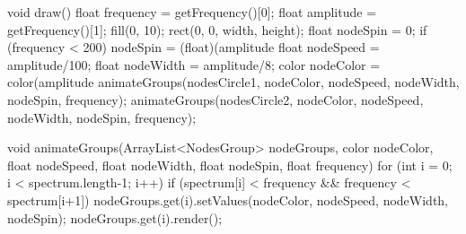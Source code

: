 \documentclass[a4paper, 10pt]{book} %
\begin{document}
void draw()
{    
  float frequency = getFrequency()[0];
  float amplitude = getFrequency()[1]; 
  fill(0, 10);
  rect(0, 0, width, height);  
  float nodeSpin = 0;
  if (frequency < 200) {
    nodeSpin = (float)(amplitude%
  } 
  float nodeSpeed = amplitude/100;
  float nodeWidth = amplitude/8;
  color nodeColor = color(amplitude%
  animateGroups(nodesCircle1, nodeColor, nodeSpeed, nodeWidth, nodeSpin, frequency);
  animateGroups(nodesCircle2, nodeColor, nodeSpeed, nodeWidth, nodeSpin, frequency);
}

void animateGroups(ArrayList<NodesGroup> nodeGroups, color nodeColor, float nodeSpeed, float nodeWidth, float nodeSpin, float frequency) {
  for (int i = 0; i < spectrum.length-1; i++) {
    if (spectrum[i] < frequency && frequency < spectrum[i+1]) {
      nodeGroups.get(i).setValues(nodeColor, nodeSpeed, nodeWidth, nodeSpin);
    }
    nodeGroups.get(i).render();
  }
} 
\end{document}
